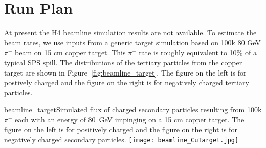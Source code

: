 \section{Run Plan}
\label{sec:runplan}


At present the H4 beamline simulation results are not available. To estimate the beam rates, we use inputs from a generic target simulation based on 100k 80 GeV $\pi^+$ beam on 15 cm copper target. This $\pi^+$ rate is roughly equivalent to 10\% of a typical SPS spill. The distributions of the tertiary particles from the copper target are shown in Figure~\ref{fig:beamline_target}. The figure on the left is for postively charged and the figure on the right is for negatively charged tertiary particles. 
\begin{cdrfigure}{beamline_target}{Simulated flux of charged secondary particles resulting from 100k $\pi^+$ each with an energy of 80~GeV impinging on a 15 cm copper target. The figure on the left is for positively charged and the figure on the right is for negatively charged secondary particles.}
\texttt{[image: beamline\_CuTarget.jpg]}
\end{cdrfigure}

